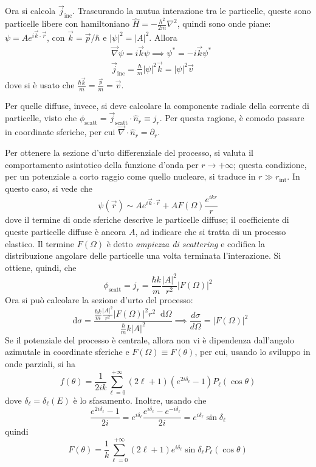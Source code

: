 \documentclass[11pt, a4paper]{scrartcl}
\theoremstyle{style}
\newcommand{\dd}{\mathop{}\!\mathrm{d}}
\numberwithin{equation}{subsection}
\begin{document}
\noindent Ora si calcola $\vec{j}_\text{inc}$.
Trascurando la mutua interazione tra le particelle, queste sono particelle libere con hamiltoniano $\hat{H} = -\frac{\hbar ^2}{2m} \nabla ^2$, quindi sono onde piane: $\psi  = A e^{i \vec{k}\cdot \vec{r}}$, con $\vec{k}=\vec{p}/\hbar $ e $\lvert \psi  \rvert ^2 = \lvert A \rvert ^2$.
Allora
\[
	\begin{split}
		&\vec{\nabla }\psi  = i \vec{k}\psi  \implies \psi ^* = - i \vec{k}\psi ^*\\
		& \vec{j}_\text{inc} = \frac{\hbar }{m} \lvert \psi  \rvert ^2 \vec{k} = \lvert \psi  \rvert ^2 \vec{v}
	\end{split}
\] 
dove si \`e usato che $\frac{\hbar \vec{k}}{m} = \frac{\vec{p}}{m} = \vec{v}$.

Per quelle diffuse, invece, si deve calcolare la componente radiale della corrente di particelle, visto che $\phi _\text{scatt} = \vec{j}_\text{scatt} \cdot \hat{n}_r \equiv j_r$.
Per questa ragione, \`e comodo passare in coordinate sferiche, per cui $\vec{\nabla } \cdot \hat{n}_r=\partial _r$.

Per ottenere la sezione d'urto differenziale del processo, si valuta il comportamento asintotico della funzione d'onda per $r\to +\infty$; questa condizione, per un potenziale a corto raggio come quello nucleare, si traduce in $r \gg r_\text{int}$.
In questo caso, si vede che 
\[
\psi (\vec{r}) \sim A e^{i \vec{k}\cdot \vec{r}} + AF(\Omega ) \frac{e^{ikr}}{r}
\] 
dove il termine di onde sferiche descrive le particelle diffuse; il coefficiente di queste particelle diffuse \`e ancora $A$, ad indicare che si tratta di un processo elastico.
Il termine $F(\Omega )$ \`e detto \textit{ampiezza di scattering} e codifica la distribuzione angolare delle particelle una volta terminata l'interazione.
Si ottiene, quindi, che 
\[
\phi _\text{scatt} = j_r = \frac{\hbar k}{m} \frac{\lvert A \rvert ^2}{r^2} \lvert F(\Omega ) \rvert ^2
\] 
Ora si pu\`o calcolare la sezione d'urto del processo:
\begin{equation}
\dd \sigma  = \frac{\frac{\hbar k}{m} \frac{\lvert A \rvert ^2 }{r^2} \lvert F(\Omega ) \rvert ^2 r^2 \dd \Omega }{\frac{\hbar }{m} k \lvert A \rvert ^2} \implies \frac{d \sigma }{d \Omega } = \lvert F(\Omega ) \rvert ^2
\end{equation}
Se il potenziale del processo \`e centrale, allora non vi \`e dipendenza dall'angolo azimutale in coordinate sferiche e $F(\Omega ) \equiv F(\theta )$, per cui, usando lo sviluppo in onde parziali, si ha
\begin{equation}
	f(\theta ) = \frac{1}{2 i k} \sum_{\ell =0}^{+\infty} (2\ell +1) \left(e^{2 i \delta _\ell } - 1\right)  P_\ell (\cos \theta )
\end{equation}
dove $\delta _\ell = \delta _\ell (E)$ \`e lo sfasamento.
Inoltre, usando che 
\[
\frac{e^{2 i \delta _\ell } -1}{2i} = e^{i \delta _\ell } \frac{e^{i\delta _\ell } - e ^{-i \delta _\ell }}{2 i} = e^{i \delta _\ell } \sin \delta _\ell 
\] 
quindi
\begin{equation}
	F(\theta ) = \frac{1}{k} \sum_{\ell =0}^{+\infty} (2\ell +1) e^{i \delta _\ell } \sin \delta _\ell  P_\ell (\cos \theta )
\end{equation}
\end{document}
